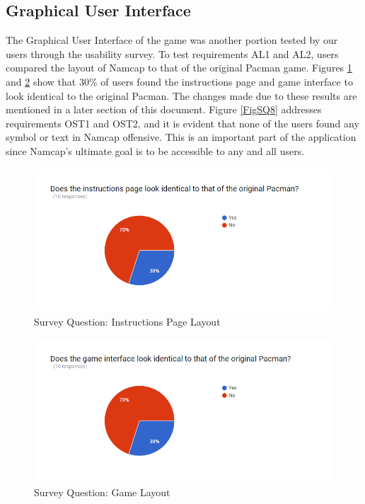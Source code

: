 \documentclass[12pt, titlepage]{article}
\begin{document}
\subsection{Graphical User Interface}

The Graphical User Interface of the game was another portion tested by our users through the usability survey. To test requirements AL1 and AL2, users compared the layout of Namcap to that of the original Pacman game. Figures \ref{FigSQ4} and \ref{FigSQ5} show that 30\% of users found the instructions page and game interface to look identical to the original Pacman. The changes made due to these results are mentioned in a later section of this document. Figure \ref{FigSQ8} addresses requirements OST1 and OST2, and it is evident that none of the users found any symbol or text in Namcap offensive. This is an important part of the application since Namcap's ultimate goal is to be accessible to any and all users.

\begin{figure}[H]
\centering
\includegraphics[width=1.0\textwidth]{SurveyQuestion4.png}
\caption{Survey Question: Instructions Page Layout}
\label{FigSQ4}
\end{figure}

\begin{figure}[H]
\centering
\includegraphics[width=1.0\textwidth]{SurveyQuestion5.png}
\caption{Survey Question: Game Layout}
\label{FigSQ5}
\end{figure}
\end{document}
